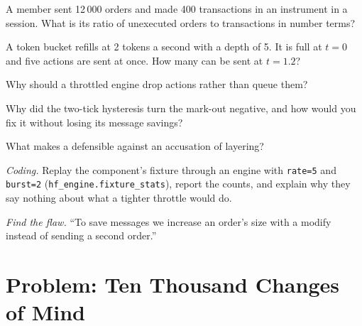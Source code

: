 \begin{exercise}[$\star$]\label{exo:hf:the-quoting-engine:2}
A member sent 12\,000 orders and made 400 transactions in an instrument in a session. What is its ratio of unexecuted orders to transactions in number
terms?
\end{exercise}

\begin{exercise}[$\star$]\label{exo:hf:the-quoting-engine:3}
A token bucket refills at 2 tokens a second with a depth of 5. It is full at $t=0$ and five actions are sent at once. How many can be sent at
$t=1.2$?
\end{exercise}

\begin{exercise}[$\star\star$]\label{exo:hf:the-quoting-engine:4}
Why should a throttled engine drop actions rather than queue them?
\end{exercise}

\begin{exercise}[$\star\star$]\label{exo:hf:the-quoting-engine:5}
Why did the two-tick hysteresis turn the mark-out negative, and how would you fix it without losing its message savings?
\end{exercise}

\begin{exercise}[$\star\star$]\label{exo:hf:the-quoting-engine:6}
What makes a  defensible against an accusation of layering?
\end{exercise}

\begin{exercise}[$\star\star\star$]\label{exo:hf:the-quoting-engine:7}
\emph{Coding.} Replay the component's fixture through an engine with \texttt{rate=5} and \texttt{burst=2}
(\texttt{hf\_engine.fixture\_stats}), report the counts, and explain why they say nothing about what a tighter throttle would do.
\end{exercise}

\begin{exercise}[$\star\star\star$]\label{exo:hf:the-quoting-engine:8}
\emph{Find the flaw.} ``To save messages we increase an order's size with a modify instead of sending a second order.''
\end{exercise}

\section{Problem: Ten Thousand Changes of Mind}

